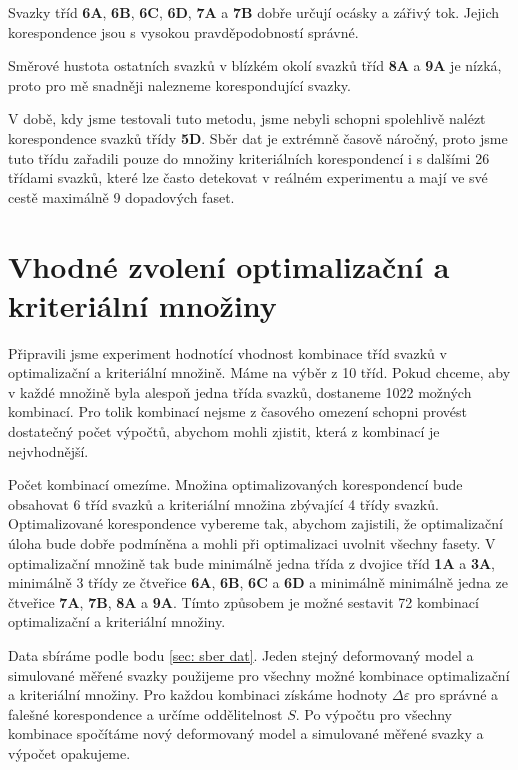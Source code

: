 Svazky tříd \textbf{6A}, \textbf{6B}, \textbf{6C}, \textbf{6D}, \textbf{7A} a \textbf{7B} dobře určují ocásky a zářivý tok. Jejich korespondence jsou s vysokou pravděpodobností správné. 

Směrové hustota ostatních svazků v blízkém okolí svazků tříd \textbf{8A} a \textbf{9A} je nízká, proto pro mě snadněji nalezneme korespondující svazky. 

V době, kdy jsme testovali tuto metodu, jsme nebyli schopni spolehlivě nalézt korespondence svazků třídy \textbf{5D}. Sběr dat je extrémně časově náročný, proto jsme tuto třídu zařadili pouze do množiny kriteriálních korespondencí i s dalšími 26 třídami svazků, které lze často detekovat v reálném experimentu a mají ve své cestě maximálně 9 dopadových faset. 


\section{Vhodné zvolení optimalizační a kriteriální množiny}
\label{sec: vhodnostOpt}
	Připravili jsme experiment hodnotící vhodnost kombinace tříd svazků v optimalizační a kriteriální množině. Máme na výběr z 10 tříd. Pokud chceme, aby v každé množině byla alespoň jedna třída svazků, dostaneme 1022 možných kombinací. Pro tolik kombinací nejsme z časového omezení schopni provést dostatečný počet výpočtů, abychom mohli zjistit, která z kombinací je nejvhodnější. 

	Počet kombinací omezíme. Množina optimalizovaných korespondencí bude obsahovat 6 tříd svazků a kriteriální množina zbývající 4 třídy svazků. Optimalizované korespondence vybereme tak, abychom zajistili, že optimalizační úloha bude dobře podmíněna a mohli při optimalizaci uvolnit všechny fasety. V optimalizační množině tak bude  minimálně jedna třída z dvojice tříd \textbf{1A} a \textbf{3A}, minimálně 3 třídy ze čtveřice \textbf{6A}, \textbf{6B}, \textbf{6C} a \textbf{6D} a minimálně minimálně jedna ze čtveřice \textbf{7A}, \textbf{7B}, \textbf{8A} a \textbf{9A}. Tímto způsobem je možné sestavit 72 kombinací optimalizační a kriteriální množiny. 
	
	Data sbíráme podle bodu \ref{sec: sber dat}. Jeden stejný deformovaný model a simulované měřené svazky použijeme pro všechny možné kombinace optimalizační a kriteriální množiny. Pro každou kombinaci získáme hodnoty $\Delta\varepsilon$ pro správné a falešné korespondence a určíme oddělitelnost $S$. Po výpočtu pro všechny kombinace spočítáme nový deformovaný model a simulované měřené svazky a výpočet opakujeme. 
	
